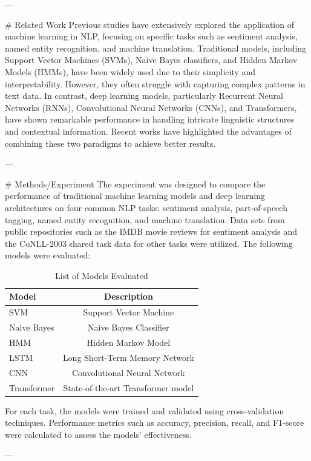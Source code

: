 ---

# Related Work
Previous studies have extensively explored the application of machine learning in NLP, focusing on specific tasks such as sentiment analysis, named entity recognition, and machine translation. Traditional models, including Support Vector Machines (SVMs), Naive Bayes classifiers, and Hidden Markov Models (HMMs), have been widely used due to their simplicity and interpretability. However, they often struggle with capturing complex patterns in text data. In contrast, deep learning models, particularly Recurrent Neural Networks (RNNs), Convolutional Neural Networks (CNNs), and Transformers, have shown remarkable performance in handling intricate linguistic structures and contextual information. Recent works have highlighted the advantages of combining these two paradigms to achieve better results.

---

# Methods/Experiment
The experiment was designed to compare the performance of traditional machine learning models and deep learning architectures on four common NLP tasks: sentiment analysis, part-of-speech tagging, named entity recognition, and machine translation. Data sets from public repositories such as the IMDB movie reviews for sentiment analysis and the CoNLL-2003 shared task data for other tasks were utilized. The following models were evaluated:

\begin{table}[htbp]
\centering
\caption{List of Models Evaluated}
\begin{tabular}{|l|c|}
\hline
\textbf{Model} & \textbf{Description} \\
\hline
SVM & Support Vector Machine \\
Naive Bayes & Naive Bayes Classifier \\
HMM & Hidden Markov Model \\
LSTM & Long Short-Term Memory Network \\
CNN & Convolutional Neural Network \\
Transformer & State-of-the-art Transformer model \\
\hline
\end{tabular}
\end{table}

For each task, the models were trained and validated using cross-validation techniques. Performance metrics such as accuracy, precision, recall, and F1-score were calculated to assess the models' effectiveness.

---

